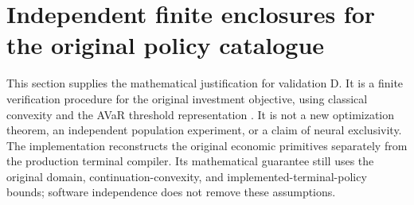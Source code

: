 \section{Independent finite enclosures for the original policy catalogue}
\label{supp:independentvalidation119}

This section supplies the mathematical justification for validation D.  It is
a finite verification procedure for the original investment objective, using
classical convexity and the AVaR threshold representation
\citep{rockafellaruryasev2002,boyd2004}.  It is not a new optimization theorem,
an independent population experiment, or a claim of neural exclusivity.
The implementation reconstructs the original economic primitives separately
from the production terminal compiler.  Its mathematical guarantee still
uses the original domain, continuation-convexity, and implemented-terminal-policy
bounds; software independence does not remove these assumptions.

